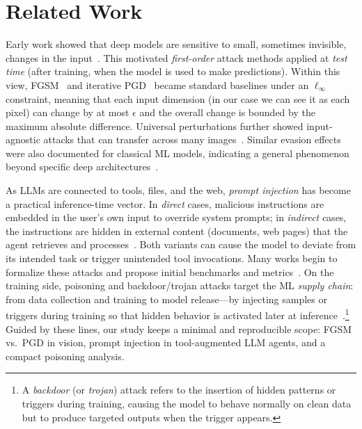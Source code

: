 \documentclass{article}
\begin{document}
\section{Related Work}\label{sec:relatedwork}
Early work showed that deep models are sensitive to small, sometimes invisible, changes in the input~\cite{szegedy2014intriguingpropertiesneuralnetworks}. This motivated \textit{first-order} attack methods applied at \emph{test time} (after training, when the model is used to make predictions). Within this view, FGSM~\cite{goodfellow2015explainingharnessingadversarialexamples} and iterative PGD~\cite{madry2019deeplearningmodelsresistant} became standard baselines under an \(\ell_\infty\) constraint, meaning that each input dimension (in our case we can see it as each pixel) can change by at most \(\epsilon\) and the overall change is bounded by the maximum absolute difference. Universal perturbations further showed input-agnostic attacks that can transfer across many images~\cite{moosavidezfooli2017universaladversarialperturbations}. Similar evasion effects were also documented for classical ML models, indicating a general phenomenon beyond specific deep architectures~\cite{Biggio_2013}.

As LLMs are connected to tools, files, and the web, \textit{prompt injection} has become a practical inference-time vector. In \textit{direct} cases, malicious instructions are embedded in the user's own input to override system prompts; in \textit{indirect} cases, the instructions are hidden in external content (documents, web pages) that the agent retrieves and processes~\cite{greshake2023youvesignedforcompromising}. Both variants can cause the model to deviate from its intended task or trigger unintended tool invocations. Many works begin to formalize these attacks and propose initial benchmarks and metrics~\cite{liu2024formalizingbenchmarkingpromptinjection}. On the training side, poisoning and backdoor/trojan attacks target the ML \textit{supply chain}: from data collection and training to model release—by injecting samples or triggers during training so that hidden behavior is activated later at inference~\cite{biggio2013poisoningattackssupportvector,shafahi2018poison,gu2019badnetsidentifyingvulnerabilitiesmachine,liu2018trojaning}.\footnote{%
  A \textit{backdoor} (or \textit{trojan}) attack refers to the insertion of hidden patterns or triggers during training, causing the model to behave normally on clean data but to produce targeted outputs when the trigger appears.} Guided by these lines, our study keeps a minimal and reproducible scope: FGSM vs.\ PGD in vision, prompt injection in tool-augmented LLM agents, and a compact poisoning analysis.
\end{document}
